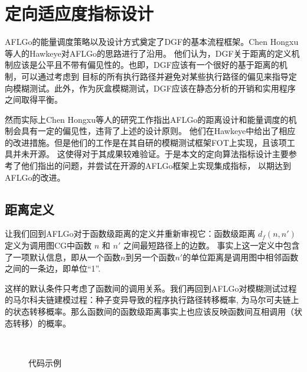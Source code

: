 \documentclass[bachelor]{njupthesis}
\begin{document}
\section{定向适应度指标设计}
AFLGo的能量调度策略以及设计方式奠定了DGF的基本流程框架。Chen Hongxu等人的Hawkeye\cite{chen2018hawkeye}对AFLGo的思路进行了沿用。
他们认为，DGF关于距离的定义机制应该是公平且不带有偏见性的。也即，DGF应该有一个很好的基于距离的机制，可以通过考虑到
目标的所有执行路径并避免对某些执行路径的偏见来指导定向模糊测试。此外，作为灰盒模糊测试，DGF应该在静态分析的开销和实用程序之间取得平衡。

然而实际上Chen Hongxu等人的研究工作指出AFLGo的距离设计和能量调度的机制会具有一定的偏见性，违背了上述的设计原则。
他们在Hawkeye中给出了相应的改进措施。但是他们的工作是在其自研的模糊测试框架FOT\cite{chen2018fot}上实现，且该项工具并未开源。
这使得对于其成果较难验证。于是本文的定向算法指标设计主要参考了他们指出的问题，并尝试在开源的AFLGo框架上实现集成指标，
以期达到AFLGo的改进。

\subsection{距离定义}\label{sec:disredefine}
让我们回到AFLGo对于函数级距离的定义并重新审视它：函数级距离 $d_f(n, n')$ 定义为调用图CG中函数 $n$ 和 $n'$ 之间最短路径上的边数。
事实上这一定义中包含了一项默认信息，即从一个函数$n$到另一个函数$n'$的单位距离是调用图中相邻函数之间的一条边，即单位“1”.

这样的默认条件只考虑了函数间的调用关系。我们再回到AFLGo对模糊测试过程的马尔科夫链建模过程：种子变异导致的程序执行路径转移概率,
为马尔可夫链上的状态转移概率。那么函数间的函数级距离事实上也应该反映函数间互相调用（状态转移）的概率。

\begin{figure}[htb]
	\centering
	 \\
	\caption{代码示例}
 	\label{pic:code}
\end{figure}
\end{document}

